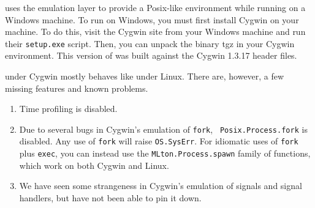 
{\mlton} uses the 
emulation layer to provide a Posix-like environment while running on a
Windows machine.  To run {\mlton} on Windows, you must first install
Cygwin on your machine.  To do this, visit the Cygwin site from your
Windows machine and run their {\tt setup.exe} script.  Then, you can
unpack the {\mlton} binary tgz in your Cygwin environment.  This
version of {\mlton} was built against the Cygwin 1.3.17 header files.

{\mlton} under Cygwin mostly behaves like {\mlton} under Linux.  There are,
however, a few missing features and known problems.

\begin{enumerate}

\item Time profiling is disabled.

\item Due to several bugs in Cygwin's emulation of {\tt fork}, {\tt
Posix.Process.fork} is disabled.  Any use of {\tt fork} will raise
{\tt OS.SysErr}.  For idiomatic uses of {\tt fork} plus {\tt exec},
you can instead use the {\tt MLton.Process.spawn} family of functions, which
work on both Cygwin and Linux.

\item We have seen some strangeness in Cygwin's emulation of signals and
signal handlers, but have not been able to pin it down.

\end{enumerate}


